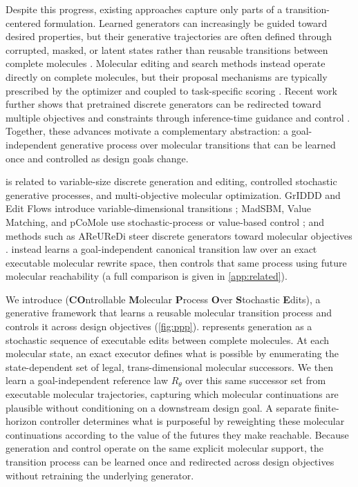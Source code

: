 Despite this progress, existing approaches capture only parts of a transition-centered formulation. Learned generators can increasingly be guided toward desired properties, but their generative trajectories are often defined through corrupted, masked, or latent states rather than reusable transitions between complete molecules \citep{vignac2023digress,campbell2024multiflow,lee2025genmol}. Molecular editing and search methods instead operate directly on complete molecules, but their proposal mechanisms are typically prescribed by the optimizer and coupled to task-specific scoring \citep{jensen2019graphga,zhou2019moldqn,xie2021mars}. Recent work further shows that pretrained discrete generators can be redirected toward multiple objectives and constraints through inference-time guidance and control \citep{chen2025areuredi,pcomole2026}. Together, these advances motivate a complementary abstraction: a goal-independent generative process over molecular transitions that can be learned once and controlled as design goals change.

\method{} is related to variable-size discrete generation and editing, controlled stochastic generative processes, and multi-objective molecular optimization. GrIDDD and Edit Flows introduce variable-dimensional transitions \citep{ninniri2025griddd,havasi2025editflows}; MadSBM, Value Matching, and pCoMole use stochastic-process or value-based control \citep{goel2026madsbm,jensen2026valuematching,pcomole2026}; and methods such as AReUReDi steer discrete generators toward molecular objectives \citep{chen2025areuredi}. \method{} instead learns a goal-independent canonical transition law over an exact executable molecular rewrite space, then controls that same process using future molecular reachability (a full comparison is given in \cref{app:related}).

We introduce \textbf{\method{}} (\textbf{CO}ntrollable \textbf{M}olecular \textbf{P}rocess \textbf{O}ver \textbf{S}tochastic \textbf{E}dits), a generative framework that learns a reusable molecular transition process and controls it across design objectives (\cref{fig:ppp}). \method{} represents generation as a stochastic sequence of executable edits between complete molecules. At each molecular state, an exact executor defines what is possible by enumerating the state-dependent set of legal, trans-dimensional molecular successors. We then learn a goal-independent reference law $R_\theta$ over this same successor set from executable molecular trajectories, capturing which molecular continuations are plausible without conditioning on a downstream design goal. A separate finite-horizon controller determines what is purposeful by reweighting these molecular continuations according to the value of the futures they make reachable. Because generation and control operate on the same explicit molecular support, the transition process can be learned once and redirected across design objectives without retraining the underlying generator.

